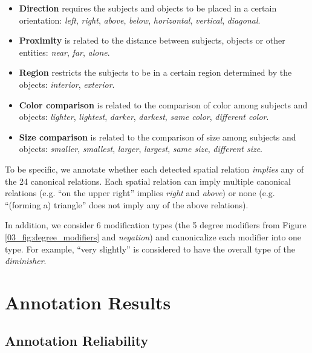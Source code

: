 \begin{itemize}

\item \textbf{Direction} requires the subjects and objects to be placed in a certain orientation: \textit{left}, \textit{right}, \textit{above}, \textit{below}, \textit{horizontal}, \textit{vertical}, \textit{diagonal}.

\item \textbf{Proximity} is related to the distance between subjects, objects or other entities: \textit{near}, \textit{far}, \textit{alone}.

\item \textbf{Region} restricts the subjects to be in a certain region determined by the objects: \textit{interior}, \textit{exterior}.

\item \textbf{Color comparison} is related to the comparison of color among subjects and objects: \textit{lighter}, \textit{lightest}, \textit{darker}, \textit{darkest}, \textit{same color}, \textit{different color}.

\item \textbf{Size comparison} is related to the comparison of size among subjects and objects: \textit{smaller}, \textit{smallest}, \textit{larger}, \textit{largest}, \textit{same size}, \textit{different size}.

\end{itemize}

To be specific, we annotate whether each detected spatial relation \textit{implies} any of the 24 canonical relations. Each spatial relation can imply multiple canonical relations (e.g. ``on the upper right'' implies \textit{right} and \textit{above}) or none (e.g. ``(forming a) triangle'' does not imply any of the above relations).

In addition, we consider 6 modification types (the 5 degree modifiers from Figure \ref{03_fig:degree_modifiers} and \textit{negation}) and canonicalize each modifier into one type. For example, ``very slightly'' is considered to have the overall type of the \textit{diminisher}.


\section{Annotation Results}
\label{05_sec:annotation_results}

\subsection{Annotation Reliability}
\label{05_subsec:annotation_reliability}


